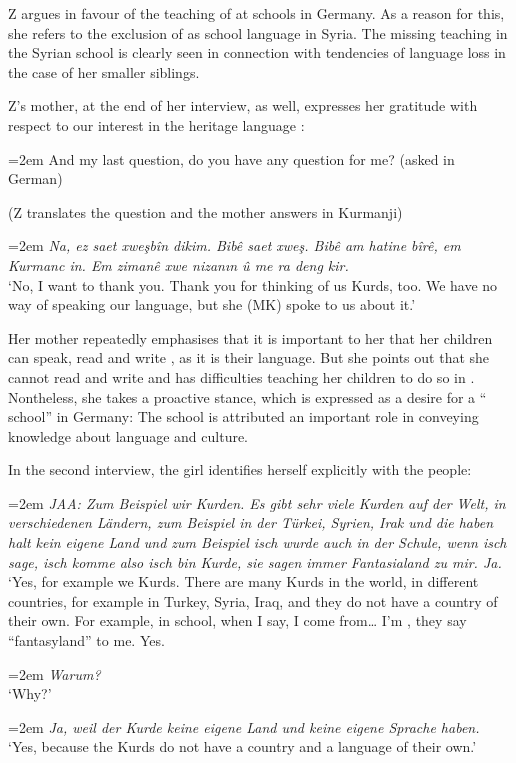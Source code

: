 \documentclass[output=paper,colorlinks,citecolor=brown]{langscibook}
\newenvironment{interview}{
  \setlength{\leftskip}{2.5em} %
  \setlength{\rightskip}{2.5em} %
  \setlength{\parindent}{0pt} %
  \vspace{\topsep} %
}{
  \vspace{\topsep} %
}
\newcommand{\speaker}[1]{%
  \noindent\hangindent=2em\makebox[1.5em][l]{#1:}\hspace{0.5em}%
}
\newcommand{\myattrib}[1]{%
    \attrib{#1}
}
\begin{document}
Z argues in favour of the teaching of  at schools in Germany. As a reason for this, she refers to the exclusion of  as school language in Syria. The missing  teaching in the Syrian school is clearly seen in connection with tendencies of language loss in the case of her smaller siblings.

Z's mother, at the end of her interview, as well, expresses her gratitude with respect to our interest in the heritage language :

\begin{interview}\label{ch2.5.ex.24}
\speaker{I}And my last question, do you have any question for me? (asked in German)

(Z translates the question and the mother answers in Kurmanji)

\speaker{MZ}\textit{Na, ez saet xweşbîn dikim. Bibê saet xweş. Bibê am hatine bîrê, em Kurmanc in. Em zimanê xwe nizanın û me ra deng kir.} \\
`No, I want to thank you. Thank you for thinking of us Kurds, too. We have no way of speaking our language, but she (MK) spoke to us about it.' 
\myattrib{Int 1\_Z\_mother, 569--576}
\end{interview}

Her mother repeatedly emphasises that it is important to her that her children can speak, read and write , as it is their language. But she points out that she cannot read and write and has difficulties teaching her children to do so in . Nontheless, she takes a proactive stance, which is expressed as a desire for a `` school'' in Germany: The school is attributed an important role in conveying knowledge about  language and culture.

In the second interview, the girl identifies herself explicitly with the  people:

\begin{interview}\label{ch2.5.ex.25}
\speaker{Z}\textit{JAA: Zum Beispiel wir Kurden. Es gibt sehr viele Kurden auf der Welt, in verschiedenen Ländern, zum Beispiel in der Türkei, Syrien, Irak und die haben halt kein eigene Land und zum Beispiel isch wurde auch in der Schule, wenn isch sage, isch komme also isch bin Kurde, sie sagen immer Fantasialand zu mir. Ja.} \\
`Yes, for example we Kurds. There are many Kurds in the world, in different countries, for example in Turkey, Syria, Iraq, and they do not have a country of their own. For example, in school, when I say, I come from… I'm , they say ``fantasyland'' to me. Yes. 

\speaker{I}\textit{Warum?} \\
`Why?' 

\speaker{Z}\textit{Ja, weil der Kurde keine eigene Land und keine eigene Sprache haben.} \\
`Yes, because the Kurds do not have a country and a language of their own.' 
\myattrib{Int 2\_Z 212--217}
\end{interview}
\end{document}

